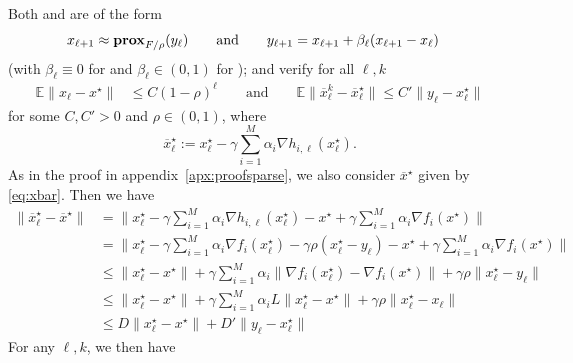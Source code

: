 Both \recoalgo and \cataalgo are of the form 
\begin{align*}
    x_{\ell+1} &\approx \mathbf{prox}_{F/\rho}(y_\ell)
    \qquad\text{and}\qquad
    y_{\ell+1} = x_{\ell+1} + \beta_\ell(x_{\ell+1} - x_\ell) 
\end{align*}
(with $\beta_\ell \equiv 0$ for \recoalgo and $\beta_\ell \in (0,1)$ for \cataalgo); and verify for all $\ell,k$
\begin{align*}
    \mathbb{E} \|x_{\ell} - x^\star \| &\leq C (1-\rho)^\ell
    \qquad\text{and}\qquad
    \mathbb{E} \|\overline{x}^k_{\ell} - \overline{x}_\ell^\star \| \leq C'  \|y_{\ell} - x_\ell^\star \| 
\end{align*}
for some $C,C'>0$ and $\rho\in(0,1)$, where 
$$
\overline{x}_\ell^\star :=  {x}_\ell^\star - \gamma \sum_{i=1}^M \alpha_i \nabla h_{i,\ell}({x}_\ell^\star).
$$
As in the proof in appendix~\ref{apx:proofsparse}, we also consider $\overline{x}^\star$ given by \eqref{eq:xbar}. 
Then we have
\begin{align*}
    \|\overline{x}_\ell^\star - \overline{x}^\star\| &=    \|{x}_\ell^\star - \gamma \sum_{i=1}^M \alpha_i \nabla h_{i,\ell}({x}_\ell^\star) - {x}^\star + \gamma \sum_{i=1}^M \alpha_i \nabla f_i({x}^\star) \| \\ 
    &=  \|{x}_\ell^\star - \gamma \sum_{i=1}^M \alpha_i \nabla f_{i}({x}_\ell^\star) - \gamma \rho ({x}_\ell^\star - {y}_\ell) - {x}^\star + \gamma \sum_{i=1}^M \alpha_i \nabla f_i({x}^\star) \| \\ 
    &\leq  \|{x}_\ell^\star - {x}^\star\| + \gamma \sum_{i=1}^M \alpha_i  \|\nabla f_i({x}_\ell^\star) - \nabla f_i({x}^\star)\| + \gamma \rho \|{x}_\ell^\star - {y}_\ell\| \\
    &\leq  \|{x}_\ell^\star - {x}^\star\| + \gamma \sum_{i=1}^M \alpha_i L \|{x}_\ell^\star - {x}^\star\| + \gamma \rho \|{x}_\ell^\star - {x}_\ell\| \\
    &\leq  D \|{x}_\ell^\star - {x}^\star\|  + D' \|y_\ell - {x}^\star_\ell\|
\end{align*}
For any $\ell,k$, we then have
